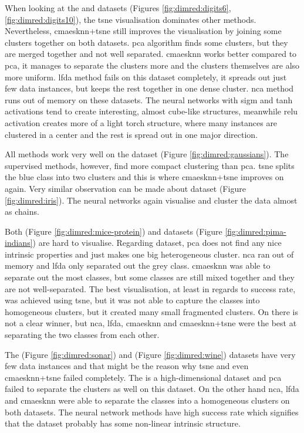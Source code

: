 \documentclass[12pt,a4paper]{report}
\begin{document}
When looking at the  and  datasets (Figures \ref{fig:dimred:digits6}, \ref{fig:dimred:digits10}), the \ac{tsne} visualisation dominates other methods. Nevertheless, \ac{cmaesknn}+\ac{tsne} still improves the visualisation by joining some clusters together on both datasets. \ac{pca} algorithm finds some clusters, but they are merged together and not well separated. \ac{cmaesknn} works better compared to \ac{pca}, it manages to separate the clusters more and the clusters themselves are also more uniform. \ac{lfda} method fails on this dataset completely, it spreads out just few data instances, but keeps the rest together in one dense cluster. \ac{nca} method runs out of memory on these datasets. The neural networks with \ac{sigm} and \ac{tanh} activations tend to create interesting, almost cube-like structures, meanwhile \ac{relu} activation creates more of a light torch structure, where many instances are clustered in a center and the rest is spread out in one major direction.

All methods work very well on the  dataset (Figure \ref{fig:dimred:gaussians}). The supervised methods, however, find more compact clustering than \ac{pca}. \ac{tsne} splits the blue class into two clusters and this is where \ac{cmaesknn}+\ac{tsne} improves on again. Very similar observation can be made about  dataset (Figure \ref{fig:dimred:iris}). The neural networks again visualise and cluster the data almost as chains.

Both  (Figure \ref{fig:dimred:mice-protein}) and  datasets (Figure \ref{fig:dimred:pima-indians}) are hard to visualise. Regarding  dataset, \ac{pca} does not find any nice intrinsic properties and just makes one big heterogeneous cluster. \ac{nca} ran out of memory and \ac{lfda} only separated out the grey class. \ac{cmaesknn} was able to separate out the most classes, but some classes are still mixed together and they are not well-separated. The best visualisation, at least in regards to success rate, was achieved using \ac{tsne}, but it was not able to capture the classes into homogeneous clusters, but it created many small fragmented clusters. On  there is not a clear winner, but \ac{nca}, \ac{lfda}, \ac{cmaesknn} and \ac{cmaesknn}+\ac{tsne} were the best at separating the two classes from each other.

The  (Figure \ref{fig:dimred:sonar}) and  (Figure \ref{fig:dimred:wine}) datasets have very few data instances and that might be the reason why \ac{tsne} and even \ac{cmaesknn}+\ac{tsne} failed completely. The  is a high-dimensional dataset and \ac{pca} failed to separate the clusters as well on this dataset. On the other hand \ac{nca}, \ac{lfda} and \ac{cmaesknn} were able to separate the classes into a homogeneous clusters on both datasets. The neural network methods have high success rate which signifies that the dataset probably has some non-linear intrinsic structure.
\end{document}
